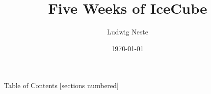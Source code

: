 \documentclass[aspectratio=169]{beamer}
\title{Five Weeks of IceCube}
\date{\today}
\author{Ludwig Neste}
\institute{\colorbox{mDarkTeal}{\texttt{[image: media/su\_logo.pdf]}}}
\begin{document}
\begin{frame}
  \titlepage
\end{frame}

\begin{frame}{Table of Contents}
  [sections numbered]
  \tableofcontents[hideallsubsections]
\end{frame}






\begin{frame}
  \nocite{*}
  \printbibliography
\end{frame}
\end{document}
